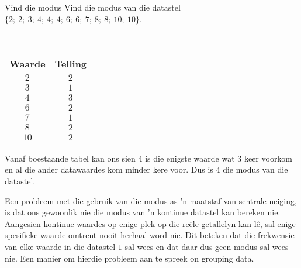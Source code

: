 \begin{wex}{Vind die modus}
{Vind die modus van die datastel $\{2;\ 2;\ 3;\ 4;\ 4;\ 4;\ 6;\ 6;\ 7;\ 8;\ 8;\ 10;\ 10\}$.}
{
\\
  \begin{center}
    \begin{tabular}{|c|c|} \hline
      \textbf{Waarde} & \textbf{Telling} \\ \hline

      $2$ & $2$ \\ \hline
      $3$ & $1$ \\\hline 
      $4$ & $3$ \\\hline
      $6$ & $2$ \\\hline
      $7$ & $1$ \\\hline
      $8$ & $2$ \\\hline
      $10$ & $2$ \\\hline

    \end{tabular}
  \end{center}


  Vanaf boestaande tabel kan ons sien $4$ is die enigste waarde wat $3$ keer voorkom en al die ander datawaardes kom minder kere voor. Dus is $4$ die modus van die datastel.
}
\end{wex}

Een probleem met die gebruik van die modus as ’n maatstaf van sentrale neiging, is dat ons gewoonlik nie die modus van ’n kontinue datastel kan bereken nie. Aangesien kontinue waardes op enige plek op die reële getallelyn kan lê, sal enige spesifieke waarde omtrent nooit herhaal word nie. Dit beteken dat die frekwensie van elke waarde in die datastel $1$ sal wees en dat daar dus geen modus sal wees nie. Een manier om hierdie probleem aan te spreek 
on grouping data.

